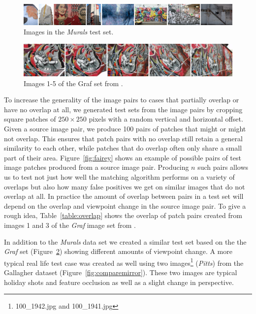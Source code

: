 \begin{figure}[t]
	\centering
	\includegraphics[width=\textwidth]{images/murals}
	\caption{Images in the \emph{Murals} test set.}
	\label{fig:murals}
\end{figure}

\begin{figure}[htb]
	\centering
	\includegraphics[width=\columnwidth]{images/graf12345.jpg}
	\caption{Images 1-5 of the Graf set from \cite{mikolajczyk2005performance}.}
	\label{fig:Graf}
\end{figure}

To increase the generality of the image pairs to cases that partially 
overlap or have no overlap at all, we generated test sets from the image 
pairs by cropping square patches of $250\!\times\!250$ pixels with a 
random vertical and horizontal offset.  Given a source image pair, we 
produce 100 pairs of patches that might or might not overlap.  This 
ensures that patch pairs with no overlap still retain a general 
similarity to each other, while patches that do overlap often only share 
a small part of their area.  Figure~\ref{fig:fairey} shows an example of 
possible pairs of test image patches produced from a source image pair.  
Producing $n$ such pairs allows us to test not just how well the 
matching algorithm performs on a variety of overlaps but also how many 
false positives we get on similar images that do not overlap at all. In 
practice the amount of overlap between pairs in a test set will depend 
on the overlap and viewpoint change in the source image pair.  To give a 
rough idea, Table~\ref{table:overlap} shows the overlap of patch pairs 
created from images 1 and 3 of the \emph{Graf} image set from 
\cite{mikolajczyk2005performance}.

In addition to the \emph{Murals} data set we created a similar test set
based on the the \emph{Graf} set (Figure~\ref{fig:Graf}) showing 
different amounts of viewpoint change. A more typical real life test 
case was created as well using two images\footnote{100\_1942.jpg and 
100\_1941.jpg} (\emph{Pitts}) from the Gallagher dataset 
\cite{gallagher2008} (Figure~\ref{fig:comparemirror}). These two images 
are typical holiday shots and feature occlusion as well as a slight 
change in perspective.

